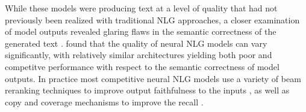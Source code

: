 While these models were producing text at a level of quality that had not 
previously been realized with traditional NLG approaches, a closer 
examination of model outputs revealed glaring flaws in the semantic correctness
of the generated text \citep{kryscinski2019,kryscinski2020,maynez2020}. 
\cite{dusek2020} found that the quality of neural NLG models
 can vary significantly, with relatively
similar architectures yielding both poor and competitve performance
with respect to the semantic correctness of model outputs. In practice
most competitive neural NLG models use a variety of beam reranking techniques 
to improve output faithfulness to the inputs
\citep{dusek2016,juraska2018,wen2015},
as well as copy and coverage mechanisms to improve the recall 
\citep{see2017,elder2018}.

